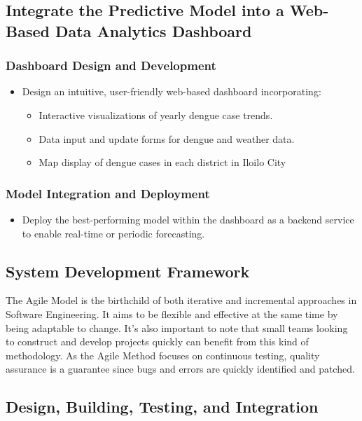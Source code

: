 \subsection{Integrate the Predictive Model into a Web-Based Data Analytics Dashboard}

\subsubsection{Dashboard Design and Development}
\begin{itemize}
	\item Design an intuitive, user-friendly web-based dashboard incorporating:
	\begin{itemize}
		\item Interactive visualizations of yearly dengue case trends.
		\item Data input and update forms for dengue and weather data.
		\item Map display of dengue cases in each district in Iloilo City
	\end{itemize}
\end{itemize}

\subsubsection{Model Integration and Deployment}
\begin{itemize}
	\item Deploy the best-performing model within the dashboard as a backend service to enable real-time or periodic forecasting.
\end{itemize}


\subsection{System Development Framework}
The Agile Model is the birthchild of both iterative and incremental approaches in Software Engineering. It aims to be flexible and effective at the same time by being adaptable to change. It's also important to note that small teams looking to construct and develop projects quickly can benefit from this kind of methodology. As the Agile Method focuses on continuous testing, quality assurance is a guarantee since bugs and errors are quickly identified and patched. 

\subsection{Design, Building, Testing, and Integration}
